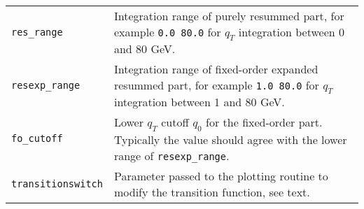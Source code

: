 \begin{longtable}{p{1.5cm}p{12cm}}
\begin{minipage}[t]{0.24\columnwidth}
\texttt{res\_range}\strut
\end{minipage} & \begin{minipage}[t]{0.71\columnwidth}\raggedright
Integration range of purely resummed part, for example \texttt{0.0 80.0}
for \(q_T\) integration between 0 and 80 GeV.\strut
\end{minipage}\tabularnewline
\begin{minipage}[t]{0.24\columnwidth}\raggedright
\texttt{resexp\_range}\strut
\end{minipage} & \begin{minipage}[t]{0.71\columnwidth}\raggedright
Integration range of fixed-order expanded resummed part, for example
\texttt{1.0 80.0} for \(q_T\) integration between 1 and 80 GeV.\strut
\end{minipage}\tabularnewline
\begin{minipage}[t]{0.24\columnwidth}\raggedright
\texttt{fo\_cutoff}\strut
\end{minipage} & \begin{minipage}[t]{0.71\columnwidth}\raggedright
Lower \(q_T\) cutoff $q_0$ for the fixed-order part. %
Typically the value should agree with the lower range of \texttt{resexp\_range}.\strut
\end{minipage}\tabularnewline
\begin{minipage}[t]{0.24\columnwidth}\raggedright
\texttt{transitionswitch}\strut
\end{minipage} & \begin{minipage}[t]{0.71\columnwidth}\raggedright
Parameter passed to the plotting routine to modify the transition
function, see text.\strut
\end{minipage}\tabularnewline
\hline
\end{longtable}
